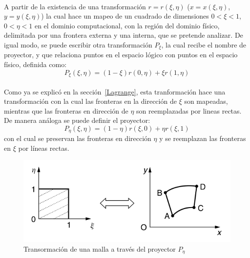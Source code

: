 \documentclass[letterpaper, openright, 12pt]{book}
\begin{document}
    \paragraph*{}
    A partir de la existencia de una transformación $r = r(\xi, \eta)$
    ($x = x(\xi, \eta)$, $y = y(\xi, \eta)$) la cual hace un mapeo de un
    cuadrado de dimensiones $0 < \xi < 1$, $0 < \eta < 1$ en el dominio
    computacional, con la región del dominio físico, delimitada por una
    frontera externa y una interna, que se pretende analizar.
    De igual modo, se puede escribir otra transformación $P_{\xi}$,
    la cual recibe el nombre de proyector, y que relaciona puntos en el
    espacio lógico con puntos en el espacio físico, definida como:
    \begin{equation}
        P_{\xi}(\xi, \eta) = (1 - \xi)r(0, \eta) + \xi r(1, \eta)
    \end{equation}

    \paragraph*{}
    Como ya se explicó en la sección~\ref{Lagrange}, esta tranformación hace
    una transformación con la cual las fronteras en la dirección de $\xi$
    son mapeadas, mientras que las fronteras en dirección de $\eta$ son
    reemplazadas por lineas rectas. De manera análoga se puede definir el
    proyector:
    \begin{equation}
        P_{\eta}(\xi, \eta) = (1 - \eta)r(\xi, 0) + \eta r(\xi, 1)
    \end{equation}
    con el cual se preservan las fronteras en dirección $\eta$ y se
    reemplazan las fronteras en $\xi$ por líneas rectas.
    \begin{figure}[htbp!]
        \centering
        \includegraphics[keepaspectratio, width=120mm]{./Imagenes/mapeo_eta}
        \caption[Transformación de malla por $P_{\eta}$]{Transormación de
        una malla a través del proyector $P_{\eta}$ \cite{farrashkhalvat}}
        \label{fig:mapeo_eta}
    \end{figure}
\end{document}
